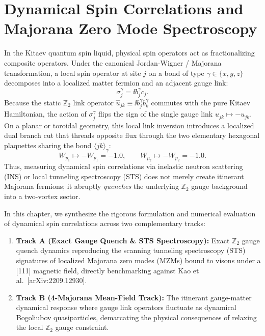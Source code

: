 
\chapter{Dynamical Spin Correlations and Majorana Zero Mode Spectroscopy}
\label{ch:phase3_dynamical_correlations}

In the Kitaev quantum spin liquid, physical spin operators act as fractionalizing composite operators. Under the canonical Jordan-Wigner / Majorana transformation, a local spin operator at site $j$ on a bond of type $\gamma \in \{x, y, z\}$ decomposes into a localized matter fermion and an adjacent gauge link:
\begin{equation}
\label{eq:p3_spin_operator_majorana}
\sigma_j^\gamma = \ii b_j^\gamma c_j.
\end{equation}
Because the static $\mathbb{Z}_2$ link operator $\hat{u}_{jk} \equiv \ii b_j^\gamma b_k^\gamma$ commutes with the pure Kitaev Hamiltonian, the action of $\sigma_j^\gamma$ flips the sign of the single gauge link $u_{jk} \mapsto -u_{jk}$. On a planar or toroidal geometry, this local link inversion introduces a localized dual branch cut that threads opposite flux through the two elementary hexagonal plaquettes sharing the bond $\langle jk \rangle_\gamma$:
\begin{equation}
\label{eq:p3_vison_pair_creation}
W_{p_1} \longmapsto -W_{p_1} = -1.0, \qquad W_{p_2} \longmapsto -W_{p_2} = -1.0.
\end{equation}
Thus, measuring dynamical spin correlations via inelastic neutron scattering (INS) or local tunneling spectroscopy (STS) does not merely create itinerant Majorana fermions; it abruptly \emph{quenches} the underlying $\mathbb{Z}_2$ gauge background into a two-vortex sector.

In this chapter, we synthesize the rigorous formulation and numerical evaluation of dynamical spin correlations across two complementary tracks:
\begin{enumerate}
    \item \textbf{Track A (Exact Gauge Quench \& STS Spectroscopy):} Exact $\mathbb{Z}_2$ gauge quench dynamics reproducing the scanning tunneling spectroscopy (STS) signatures of localized Majorana zero modes (MZMs) bound to visons under a [111] magnetic field, directly benchmarking against Kao et al.~[arXiv:2209.12930].
    \item \textbf{Track B (4-Majorana Mean-Field Track):} The itinerant gauge-matter dynamical response where gauge link operators fluctuate as dynamical Bogoliubov quasiparticles, demarcating the physical consequences of relaxing the local $\mathbb{Z}_2$ gauge constraint.
\end{enumerate}

